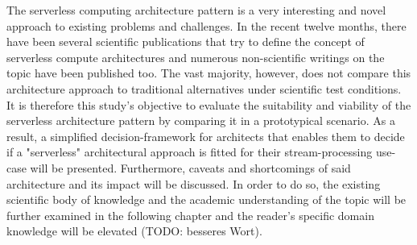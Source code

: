 The serverless computing architecture pattern is a very interesting and novel approach to existing problems and challenges. In the recent twelve months, there have been several scientific publications that try to define the concept of serverless compute architectures and numerous non-scientific writings on the topic have been published too. The vast majority, however, does not compare this architecture approach to traditional alternatives under scientific test conditions. \\
It is therefore this study's objective to evaluate the suitability and viability of the serverless architecture pattern by comparing it in a prototypical scenario. As a result, a simplified decision-framework for architects that enables them to decide if a "serverless" architectural approach is fitted for their stream-processing use-case will be presented. Furthermore, caveats and shortcomings of said architecture and its impact will be discussed. 
In order to do so, the existing scientific body of knowledge and the academic understanding of the topic will be further examined in the following chapter and the reader's specific domain knowledge will be elevated (TODO: besseres Wort). 